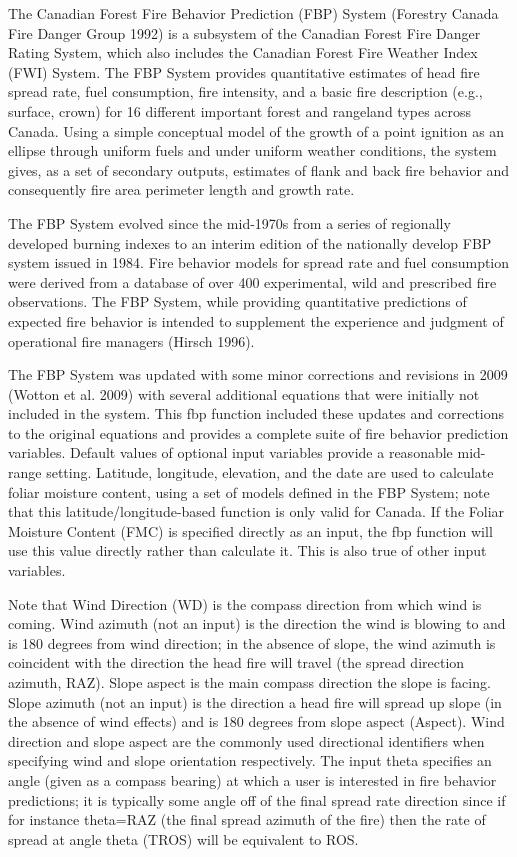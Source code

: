 \documentclass[a4paper]{book}
\begin{document}
\begin{Details}\relax
The Canadian Forest Fire Behavior Prediction (FBP) System (Forestry Canada
Fire Danger Group 1992) is a subsystem of the Canadian Forest Fire Danger
Rating System, which also includes the Canadian Forest Fire Weather Index
(FWI) System. The FBP System provides quantitative estimates of head fire
spread rate, fuel consumption, fire intensity, and a basic fire description
(e.g., surface, crown) for 16 different important forest and rangeland types
across Canada. Using a simple conceptual model of the growth of a point
ignition as an ellipse through uniform fuels and under uniform weather
conditions, the system gives, as a set of secondary outputs, estimates of
flank and back fire behavior and consequently fire area perimeter length and
growth rate.

The FBP System evolved since the mid-1970s from a series of regionally
developed burning indexes to an interim edition of the nationally develop
FBP system issued in 1984. Fire behavior models for spread rate and fuel
consumption were derived from a database of over 400 experimental, wild and
prescribed fire observations. The FBP System, while providing quantitative
predictions of expected fire behavior is intended to supplement the
experience and judgment of operational fire managers (Hirsch 1996).

The FBP System was updated with some minor corrections and revisions in 2009
(Wotton et al. 2009) with several additional equations that were initially
not included in the system. This fbp function included these updates and
corrections to the original equations and provides a complete suite of fire
behavior prediction variables. Default values of optional input variables
provide a reasonable mid-range setting. Latitude, longitude, elevation, and
the date are used to calculate foliar moisture content, using a set of
models defined in the FBP System; note that this latitude/longitude-based
function is only valid for Canada. If the Foliar Moisture Content (FMC) is
specified directly as an input, the fbp function will use this value
directly rather than calculate it. This is also true of other input
variables.

Note that Wind Direction (WD) is the compass direction from which wind is
coming. Wind azimuth (not an input) is the direction the wind is blowing to
and is 180 degrees from wind direction; in the absence of slope, the wind
azimuth is coincident with the direction the head fire will travel (the
spread direction azimuth, RAZ). Slope aspect is the main compass direction
the slope is facing. Slope azimuth (not an input) is the direction a head
fire will spread up slope (in the absence of wind effects) and is 180
degrees from slope aspect (Aspect).  Wind direction and slope aspect are the
commonly used directional identifiers when specifying wind and slope
orientation respectively.  The input theta specifies an angle (given as a
compass bearing) at which a user is interested in fire behavior predictions;
it is typically some angle off of the final spread rate direction since if
for instance theta=RAZ (the final spread azimuth of the fire) then the rate
of spread at angle theta (TROS) will be equivalent to ROS.


\end{Details}
\end{document}
